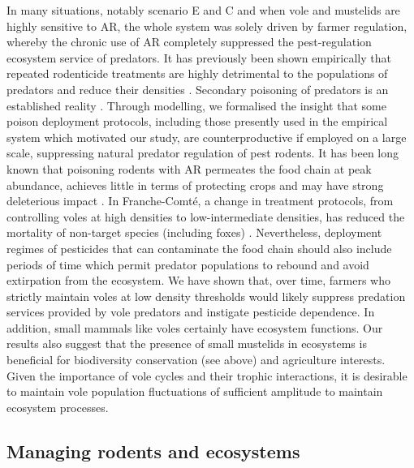 \documentclass[11pt]{article}
\begin{document}
In many situations, notably scenario E and C and when vole and mustelids are highly sensitive to AR, the whole system was solely driven by farmer regulation, whereby the chronic use of AR completely suppressed the pest-regulation ecosystem service of predators.
%
It has previously been shown empirically that repeated rodenticide treatments are highly detrimental to the populations of predators and reduce their densities  
\citep{Jacquot2013}. Secondary poisoning of predators is an established reality \citep{Berny2007}.
%
Through modelling, we formalised the insight that some poison deployment protocols, including those presently used in the empirical system which motivated our study, are counterproductive if employed on a large scale, suppressing natural predator regulation of pest rodents. It has been long known that poisoning rodents with AR permeates the food chain at peak abundance, achieves little in terms of protecting crops and may have strong deleterious impact \citep{Olea2009}. In Franche-Comté, a change in treatment protocols, from controlling voles at high densities to low-intermediate densities, has reduced the mortality of non-target species (including foxes) \citep{Jacquot2013}.
%
Nevertheless, deployment regimes of pesticides that can contaminate the food chain should also include periods of time which permit predator populations to rebound and avoid extirpation from the ecosystem.
%
We have shown that, over time, farmers who strictly maintain voles at low density thresholds would likely suppress predation services provided by vole predators and instigate pesticide dependence. In addition, small mammals like voles certainly have ecosystem functions. Our results also suggest that the presence of small mustelids in ecosystems is beneficial for biodiversity conservation (see above) and agriculture interests. Given the importance of vole cycles and their trophic interactions, it is desirable to maintain vole population fluctuations of sufficient amplitude to maintain ecosystem processes.

\subsection{Managing rodents and ecosystems}
\end{document}
